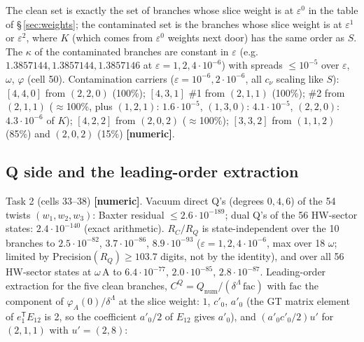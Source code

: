 \documentclass[10pt]{article}
\begin{document}
The clean set is exactly the set of branches whose slice weight is at $\varepsilon^0$ in the table of \S\,\ref{sec:weights}; the contaminated set is the branches whose slice weight is at $\varepsilon^1$ or $\varepsilon^2$, where $K$ (which comes from $\varepsilon^0$ weights next door) has the same order as $S$. The $\kappa$ of the contaminated branches are constant in $\varepsilon$ (e.g. $1.3857144,1.3857144,1.3857146$ at $\varepsilon=1,2,4\cdot10^{-6}$) with spreads $\le10^{-5}$ over $\varepsilon$, $\omega$, $\varphi$ (cell 50). Contamination carriers ($\varepsilon=10^{-6},2\cdot10^{-6}$, all $c_\nu$ scaling like $S$): $[4,4,0]$ from $(2,2,0)$ (100\%); $[4,3,1]$ \#1 from $(2,1,1)$ (100\%); \#2 from $(2,1,1)$ ($\approx$100\%, plus $(1,2,1)$: $1.6\cdot10^{-5}$, $(1,3,0)$: $4.1\cdot10^{-5}$, $(2,2,0)$: $4.3\cdot10^{-6}$ of $K$); $[4,2,2]$ from $(2,0,2)$ ($\approx$100\%); $[3,3,2]$ from $(1,1,2)$ (85\%) and $(2,0,2)$ (15\%) \textbf{[numeric]}.

\subsection{Q side and the leading-order extraction}\label{sec:a310Q}

Task 2 (cells 33--38) \textbf{[numeric]}. Vacuum direct Q's (degrees $0,4,6$) of the 54 twists $(w_1,w_2,w_3)$: Baxter residual $\le2.6\cdot10^{-189}$; dual Q's of the 56 HW-sector states: $2.4\cdot10^{-140}$ (exact arithmetic). $R_C/R_Q$ is state-independent over the 10 branches to $2.5\cdot10^{-82}$, $3.7\cdot10^{-86}$, $8.9\cdot10^{-93}$ ($\varepsilon=1,2,4\cdot10^{-6}$, max over 18 $\omega$; limited by Precision$(R_Q)\ge103.7$ digits, not by the identity), and over all 56 HW-sector states at $\omega\,\mathrm{A}$ to $6.4\cdot10^{-77}$, $2.0\cdot10^{-85}$, $2.8\cdot10^{-87}$. Leading-order extraction for the five clean branches, $C^Q=Q_{\mathrm{num}}/(\delta^\Lambda\,\mathrm{fac})$ with $\mathrm{fac}$ the component of $\varphi_A(0)/\delta^\Lambda$ at the slice weight: $1$, $c'_0$, $a'_0$ (the GT matrix element of $e_1^{\mathsf T}E_{12}$ is 2, so the coefficient $a'_0/2$ of $E_{12}$ gives $a'_0$), and $(a'_0c'_0/2)u'$ for $(2,1,1)$ with $u'=(2,8)$:
\end{document}
